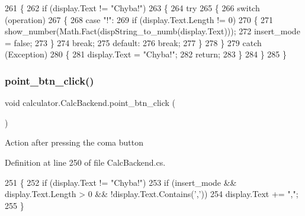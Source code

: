 \begin{DoxyCode}
261                                                             \{
262             \textcolor{keywordflow}{if} (display.Text != \textcolor{stringliteral}{"Chyba!"})
263             \{
264                 \textcolor{keywordflow}{try}
265                 \{
266                     \textcolor{keywordflow}{switch} (operation)
267                     \{
268                         \textcolor{keywordflow}{case} \textcolor{stringliteral}{"!"}:
269                             \textcolor{keywordflow}{if} (display.Text.Length != 0)
270                             \{
271                                 show\_number(Math.Fact(dispString\_to\_numb(display.Text)));
272                                 insert\_mode = \textcolor{keyword}{false};
273                             \}
274                             \textcolor{keywordflow}{break};
275                         \textcolor{keywordflow}{default}:
276                             \textcolor{keywordflow}{break};
277                     \}
278                 \}
279                 \textcolor{keywordflow}{catch} (Exception)
280                 \{
281                     display.Text = \textcolor{stringliteral}{"Chyba!"};
282                     \textcolor{keywordflow}{return};
283                 \}
284             \}
285         \}
\end{DoxyCode}
\mbox{\label{classcalculator_1_1_calc_backend_ab9c60c2990db09350499c46874be5960}} 
\subsubsection{point\+\_\+btn\+\_\+click()}
{\footnotesize\ttfamily void calculator.\+Calc\+Backend.\+point\+\_\+btn\+\_\+click (\begin{DoxyParamCaption}{ }\end{DoxyParamCaption})}



Action after pressing the coma button 



Definition at line 250 of file Calc\+Backend.\+cs.


\begin{DoxyCode}
251         \{
252             \textcolor{keywordflow}{if} (display.Text != \textcolor{stringliteral}{"Chyba!"})
253                 \textcolor{keywordflow}{if} (insert\_mode && display.Text.Length > 0 && !display.Text.Contains(\textcolor{charliteral}{','}))
254                     display.Text += \textcolor{stringliteral}{","};
255         \}
\end{DoxyCode}
\mbox{\label{classcalculator_1_1_calc_backend_a45fde6192385602edceb072b3a679887}} 
